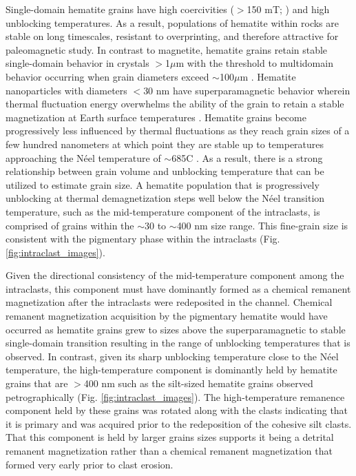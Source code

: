 \documentclass[11pt,letterpaper]{article}
\begin{document}
Single-domain hematite grains have high coercivities ($>$150 mT; \citealp{Ozdemir2014a}) and high unblocking temperatures. As a result, populations of hematite within rocks are stable on long timescales, resistant to overprinting, and therefore attractive for paleomagnetic study. In contrast to magnetite, hematite grains retain stable single-domain behavior in crystals $>$1$\mu$m with the threshold to multidomain behavior occurring when grain diameters exceed $\sim$100$\mu$m \citep{Kletetschka2002a, Ozdemir2014a}. Hematite nanoparticles with diameters $<$30 nm have superparamagnetic behavior wherein thermal fluctuation energy overwhelms the ability of the grain to retain a stable magnetization at Earth surface temperatures \citep{Ozdemir2014a}. Hematite grains become progressively less influenced by thermal fluctuations as they reach grain sizes of a few hundred nanometers at which point they are stable up to temperatures approaching the N\'eel temperature of $\sim$685\textdegree C \citep{Swanson-Hysell2011a, Ozdemir2014a}. As a result, there is a strong relationship between grain volume and unblocking temperature that can be utilized to estimate grain size. A hematite population that is progressively unblocking at thermal demagnetization steps well below the N\'eel transition temperature, such as the mid-temperature component of the intraclasts, is comprised of grains within the $\sim$30 to $\sim$400 nm size range. This fine-grain size is consistent with the pigmentary phase within the intraclasts (Fig. \ref{fig:intraclast_images}).

Given the directional consistency of the mid-temperature component among the intraclasts, this component must have dominantly formed as a chemical remanent magnetization after the intraclasts were redeposited in the channel. Chemical remanent magnetization acquisition by the pigmentary hematite would have occurred as hematite grains grew to sizes above the superparamagnetic to stable single-domain transition resulting in the range of unblocking temperatures that is observed. In contrast, given its sharp unblocking temperature close to the N\'eel temperature, the high-temperature component is dominantly held by hematite grains that are $>$400 nm such as the silt-sized hematite grains observed petrographically (Fig. \ref{fig:intraclast_images}). The high-temperature remanence component held by these grains was rotated along with the clasts indicating that it is primary and was acquired prior to the redeposition of the cohesive silt clasts. That this component is held by larger grains sizes supports it being a detrital remanent magnetization rather than a chemical remanent magnetization that formed very early  prior to clast erosion.
\end{document}
